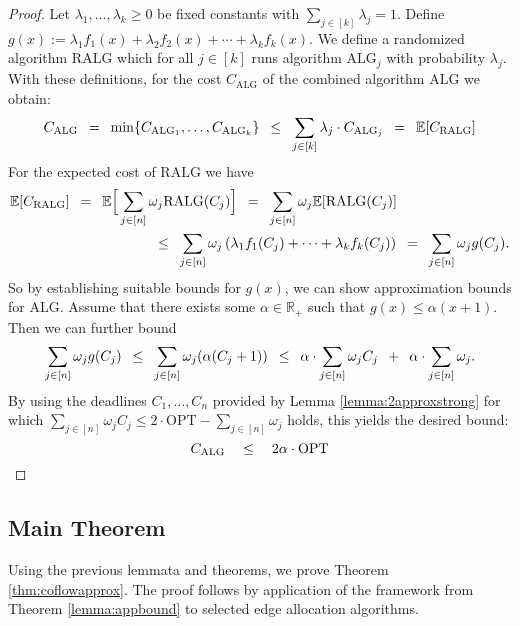 \documentclass[11pt]{article}
\newcommand{\Hquad}{\hspace{0.5em}}
\begin{document}
\begin{proof}
Let $\lambda_1,\dotsc,\lambda_k \ge 0$ be fixed constants with $\sum_{j \in [k]}\lambda_j = 1$. Define $g(x) := \lambda_1 f_1(x) + \lambda_2 f_2(x) + \cdots + \lambda_kf_k(x)$. We define a randomized algorithm $\mathrm{RALG}$ which for all $j \in [k]$ runs algorithm $\mathrm{ALG}_j$ with probability $\lambda_j$. With these definitions, for the cost $C_{\mathrm{ALG}}$ of the combined algorithm $\mathrm{ALG}$ we obtain:
\begin{equation*}
C_{\mathrm{ALG}} \Hquad=\Hquad \min \{C_{\mathrm{ALG}_1},\dotsc,C_{\mathrm{ALG}_k}\}
\Hquad\le\Hquad \sum_{j \in [k]}\lambda_j \cdot C_{\mathrm{ALG}_j}\Hquad =\Hquad \mathbb{E}[C_{\mathrm{RALG}}]
\end{equation*}
For the expected cost of $\mathrm{RALG}$ we have
\begin{align*}
\mathbb{E}[C_{\mathrm{RALG}}]&\Hquad=\Hquad \mathbb{E}\Big[\sum_{j \in [n]}\omega_j \mathrm{RALG}(C_j)\Big] \Hquad=\Hquad \sum_{j \in [n]}\omega_j \mathbb{E}[\mathrm{RALG}(C_j)]\\
~&\phantom{------}\Hquad\le\Hquad \sum_{j \in [n]}\omega_j \left(\lambda_1f_1(C_j) + \cdots + \lambda_kf_k(C_j)\right) \Hquad=\Hquad \sum_{j \in [n]}\omega_j g(C_j).\\
\end{align*}
So by establishing suitable bounds for $g(x)$, we can show approximation bounds for $\mathrm{ALG}$. Assume that there exists some $\alpha \in \mathbb{R}_+$ such that $g(x) \le \alpha(x+1)$. Then we can further bound
\begin{equation*}
 \sum_{j \in [n]}\omega_j g(C_j) \Hquad\le\Hquad \sum_{j \in [n]}\omega_j (\alpha(C_j+1)) \Hquad\le\Hquad \alpha \cdot \sum_{j \in [n]}\omega_jC_j \Hquad + \Hquad \alpha \cdot \sum_{j \in [n]}\omega_j.
\end{equation*}
By using the deadlines $C_1,\dotsc,C_n$ provided by Lemma \ref{lemma:2approxstrong} for which $\sum_{j \in [n]}\omega_j C_j \le 2 \cdot \mathrm{OPT} - \sum_{j \in [n]}\omega_j$ holds, this yields the desired bound:
\begin{equation*}
    C_{\mathrm{ALG}} \quad\le\quad 2\alpha \cdot \mathrm{OPT}\qedhere
\end{equation*}
\end{proof}


\subsection{Main Theorem}
Using the previous lemmata and theorems, we prove Theorem \ref{thm:coflowapprox}. The proof follows by application of the framework from Theorem \ref{lemma:appbound} to selected edge allocation algorithms.
\end{document}
